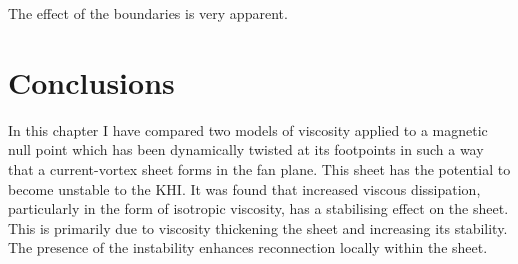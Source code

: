 The effect of the boundaries is very apparent.


\section{Conclusions}
\label{sec:khi_conclusions}

In this chapter I have compared two models of viscosity applied to a magnetic null point which has been dynamically twisted at its footpoints in such a way that a current-vortex sheet forms in the fan plane. This sheet has the potential to become unstable to the KHI. It was found that increased viscous dissipation, particularly in the form of isotropic viscosity, has a stabilising effect on the sheet. This is primarily due to viscosity thickening the sheet and increasing its stability. The presence of the instability enhances reconnection locally within the sheet.
